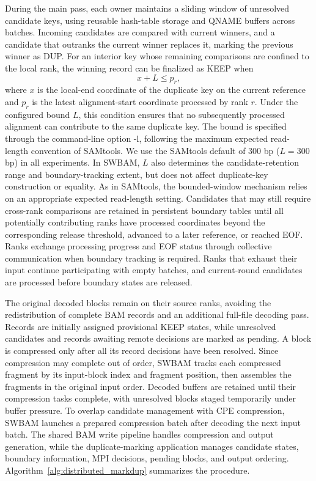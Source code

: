 \documentclass[lettersize,journal]{IEEEtran}
\begin{document}
During the main pass, each owner maintains a sliding window of unresolved candidate keys, using reusable hash-table storage and QNAME buffers across batches. 
Incoming candidates are compared with current winners, and a candidate that outranks the current winner replaces it, marking the previous winner as DUP. 
For an interior key whose remaining comparisons are confined to the local rank, the winning record can be finalized as KEEP when
\[
x+L\leq p_r,
\]
where $x$ is the local-end coordinate of the duplicate key on the current reference and $p_r$ is the latest alignment-start coordinate processed by rank $r$. 
Under the configured bound $L$, this condition ensures that no subsequently processed alignment can contribute to the same duplicate key. 
The bound is specified through the command-line option -l, following the maximum expected read-length convention of SAMtools. 
We use the SAMtools default of 300 bp ($L=300$ bp) in all experiments. 
In SWBAM, $L$ also determines the candidate-retention range and boundary-tracking extent, but does not affect duplicate-key construction or equality. 
As in SAMtools, the bounded-window mechanism relies on an appropriate expected read-length setting. 
Candidates that may still require cross-rank comparisons are retained in persistent boundary tables until all potentially contributing ranks have processed coordinates beyond the corresponding release threshold, advanced to a later reference, or reached EOF. 
Ranks exchange processing progress and EOF status through collective communication when boundary tracking is required. 
Ranks that exhaust their input continue participating with empty batches, and current-round candidates are processed before boundary states are released.

The original decoded blocks remain on their source ranks, avoiding the redistribution of complete BAM records and an additional full-file decoding pass. 
Records are initially assigned provisional KEEP states, while unresolved candidates and records awaiting remote decisions are marked as pending. 
A block is compressed only after all its record decisions have been resolved. 
Since compression may complete out of order, SWBAM tracks each compressed fragment by its input-block index and fragment position, then assembles the fragments in the original input order. 
Decoded buffers are retained until their compression tasks complete, with unresolved blocks staged temporarily under buffer pressure. 
To overlap candidate management with CPE compression, SWBAM launches a prepared compression batch after decoding the next input batch. 
The shared BAM write pipeline handles compression and output generation, while the duplicate-marking application manages candidate states, boundary information, MPI decisions, pending blocks, and output ordering.
Algorithm~\ref{alg:distributed_markdup} summarizes the procedure.
\end{document}
